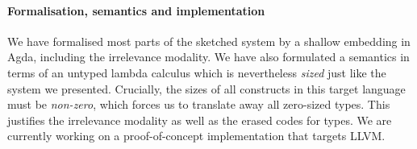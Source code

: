 

\paragraph{Formalisation, semantics and implementation}

We have formalised most parts of the sketched system by a shallow embedding in
Agda, including the irrelevance modality. We have also formulated a semantics in
terms of an untyped lambda calculus which is nevertheless \emph{sized} just like
the system we presented. Crucially, the sizes of all constructs in this target language
must be \emph{non-zero}, which forces us to translate away all zero-sized types. This
justifies the irrelevance modality as well as the erased codes for types. We are
currently working on a proof-of-concept implementation that targets LLVM.


